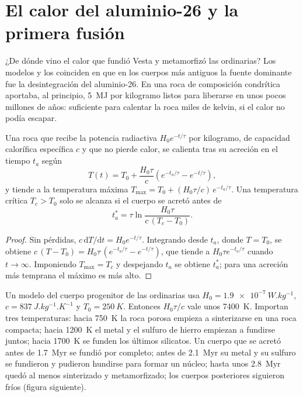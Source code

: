 \section{El calor del aluminio-26 y la primera fusión}

¿De dónde vino el calor que fundió Vesta y metamorfizó las 
ordinarias? Los modelos y los  coinciden en que en los cuerpos más antiguos
la fuente dominante fue la desintegración del aluminio-26. En una roca de composición condrítica aportaba, al principio,
\qty{5}{MJ} por kilogramo listos para liberarse en unos pocos millones de años:
suficiente para calentar la roca miles de kelvin, si el calor no podía escapar.

\begin{proposition}
\label{prop:b2:planet-formation-meteorites:heating}
Una roca que recibe la potencia radiactiva $H_0 e^{-t/\tau}$ por kilogramo, de
capacidad calorífica específica $c$ y que no pierde calor, se calienta tras su acreción en
el tiempo $t_a$ según
\[
  T(t) = T_0 + \frac{H_0\tau}{c}\left(e^{-t_a/\tau} - e^{-t/\tau}\right),
\]
y tiende a la temperatura máxima
$T_{\max} = T_0 + (H_0\tau/c)\,e^{-t_a/\tau}$. Una temperatura crítica
$T_c > T_0$ solo se alcanza si el cuerpo se acretó antes de
\[
  t_a^* = \tau\ln\frac{H_0\tau}{c\,(T_c - T_0)}.
\]
\end{proposition}

\begin{proof}
Sin pérdidas, $c\,\mathrm dT/\mathrm dt = H_0 e^{-t/\tau}$. Integrando desde
$t_a$, donde $T = T_0$, se obtiene
$c\,(T - T_0) = H_0\tau\,(e^{-t_a/\tau} - e^{-t/\tau})$, que tiende a
$H_0\tau e^{-t_a/\tau}$ cuando $t \to \infty$. Imponiendo $T_{\max} = T_c$ y despejando
$t_a$ se obtiene $t_a^*$; para una acreción más temprana el máximo es más alto.
\end{proof}

Un modelo del cuerpo progenitor de las  ordinarias usa
$H_0 = \qty{1.9e-7}{W.kg^{-1}}$, $c = \qty{837}{J.kg^{-1}.K^{-1}}$ y
$T_0 = \qty{250}{K}$. Entonces $H_0\tau/c$ vale unos \qty{7400}{K}. Importan tres
temperaturas: hacia \qty{750}{K} la roca porosa empieza a sinterizarse en una
roca compacta; hacia \qty{1200}{K} el metal y el sulfuro de hierro empiezan a fundirse
juntos; hacia \qty{1700}{K} se funden los últimos silicatos. Un cuerpo que se acretó
antes de \qty{1.7}{Myr} se fundió por completo; antes de \qty{2.1}{Myr} su metal y su sulfuro
se fundieron y pudieron hundirse para formar un núcleo; hasta unos \qty{2.8}{Myr} quedó al menos
sinterizado y metamorfizado; los cuerpos posteriores siguieron fríos (figura siguiente).

